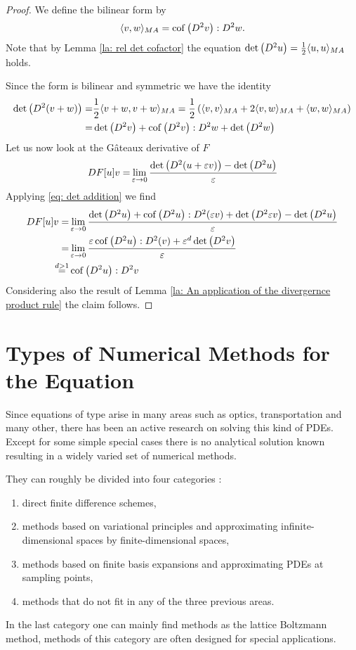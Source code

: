 	\begin{proof}
	We define the \MA bilinear form by
	\[
	 \langle v, w \rangle_{MA} = \operatorname{cof} \left( D^2 v \right):D^2w.
	\]
	Note that by Lemma \ref{la: rel det cofactor} the equation $\det{\left(D^2 u\right)} = \frac 1 2  \langle u, u \rangle_{MA}$ holds.
	
	Since the \MA form is bilinear and symmetric we have the identity
	\begin{align}
		\det{\left(D^2 (v+w)\right)} =& \frac 1 2  \langle v+w, v+w \rangle_{MA} = \frac 1 2 \left( \langle v, v \rangle_{MA} + 2  \langle v, w \rangle_{MA} +  \langle w, w \rangle_{MA} \right) \nonumber\\
		=&  \det{\left(D^2 v\right)}  + \operatorname{cof} \left( D^2 v \right) : D^2 w + \det{\left(D^2 w\right)} \label{eq: det addition}
	\end{align}
	 Let us now look at the G\^ateaux derivative of $F$
		\begin{align*}
			DF[u]v =& \lim\limits_{\varepsilon \rightarrow 0} \frac { \det{\left(D^2(u+\varepsilon v)\right)} - \det{\left(D^2u\right)}}\varepsilon\\
			\end{align*}
Applying \eqref{eq: det addition} we find
		\begin{align*}
			DF[u]v =& \lim\limits_{\varepsilon \rightarrow 0} 
										\frac  {\det{\left(D^2 u\right)} + \operatorname{cof} \left( D^2 u \right) : D^2(\varepsilon v) + \det{\left(D^2 \varepsilon v\right)} - \det{\left(D^2 u\right)}}
													\varepsilon\\ 
			 =& \lim\limits_{\varepsilon \rightarrow 0} 
										\frac  {\varepsilon \operatorname{cof} \left( D^2 u \right) : D^2(v) + \varepsilon^d \det{\left(D^2 v\right)}}
													\varepsilon\\ 
			\stackrel{d > 1} =& \operatorname{cof} \left( D^2 u \right):D^2v
		\end{align*}
Considering also the result of Lemma \ref{la: An application of the divergernce product rule} the claim follows.
	\end{proof}	


\section{Types of Numerical Methods for the \MA Equation}
Since equations of \MA type arise in many areas such as optics, transportation and many other, there has been an active research on solving this kind of PDEs. Except for some simple special cases there is no analytical solution known resulting in a widely varied set of numerical methods.

They can roughly be divided into four categories \cite[p.210]{FGN2013}: 
\begin{enumerate}
	\item direct finite difference schemes,
	\item methods based on variational principles and approximating infinite-dimensional spaces by finite-dimensional spaces,
	\item methods based on finite basis expansions and approximating PDEs at sampling points,
	\item methods that do not fit in any of the three previous areas.
\end{enumerate}
In the last category one can mainly find methods as the lattice Boltzmann method, methods of this category are often designed for special applications.

